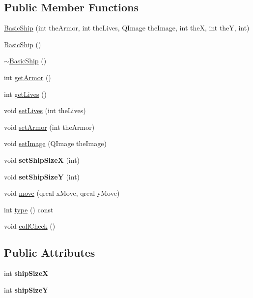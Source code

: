 \subsection*{Public Member Functions}
\begin{DoxyCompactItemize}
\item 
\hyperlink{class_basic_ship_ad7432632bd796076e9f5c25b5447807a}{BasicShip} (int theArmor, int theLives, QImage theImage, int theX, int theY, int)
\item 
\hyperlink{class_basic_ship_aa7993a536c700061baa1d0846801a111}{BasicShip} ()
\item 
\hyperlink{class_basic_ship_a54dac10003c33f1a21f6500ed33dcd6c}{$\sim$BasicShip} ()
\item 
int \hyperlink{class_basic_ship_a54134d4fe367db9649ffb4bd6a1123b7}{getArmor} ()
\item 
int \hyperlink{class_basic_ship_a3df2d25ee4bda266b5087ae6581f0162}{getLives} ()
\item 
void \hyperlink{class_basic_ship_a4f4ffdf5a17c9148478ada53b06d3e2e}{setLives} (int theLives)
\item 
void \hyperlink{class_basic_ship_ad7fbff0029da6b55b5a5f60fcad4030f}{setArmor} (int theArmor)
\item 
void \hyperlink{class_basic_ship_ad0dc07d6f5934c938efd31be0ca56a06}{setImage} (QImage theImage)
\item 
\hypertarget{class_basic_ship_a90777677113834e75c83c54e6b55f32c}{
void {\bfseries setShipSizeX} (int)}
\label{class_basic_ship_a90777677113834e75c83c54e6b55f32c}

\item 
\hypertarget{class_basic_ship_a5537c5c3e6b4908e97329dfe80de996e}{
void {\bfseries setShipSizeY} (int)}
\label{class_basic_ship_a5537c5c3e6b4908e97329dfe80de996e}

\item 
void \hyperlink{class_basic_ship_a18da035282b9ecb5f5fdab232bf7ac27}{move} (qreal xMove, qreal yMove)
\item 
int \hyperlink{class_basic_ship_a6d498fc95af4562fcec7273897f98067}{type} () const 
\item 
void \hyperlink{class_basic_ship_a30787afde7d49a62891c1b9e73e9b7d9}{collCheck} ()
\end{DoxyCompactItemize}
\subsection*{Public Attributes}
\begin{DoxyCompactItemize}
\item 
\hypertarget{class_basic_ship_a2a6848c14d821cff1eec17e861801d88}{
int {\bfseries shipSizeX}}
\label{class_basic_ship_a2a6848c14d821cff1eec17e861801d88}

\item 
\hypertarget{class_basic_ship_aa4b9d1ebf9a66bb7b35b57a065a2c1d2}{
int {\bfseries shipSizeY}}
\label{class_basic_ship_aa4b9d1ebf9a66bb7b35b57a065a2c1d2}

\end{DoxyCompactItemize}


